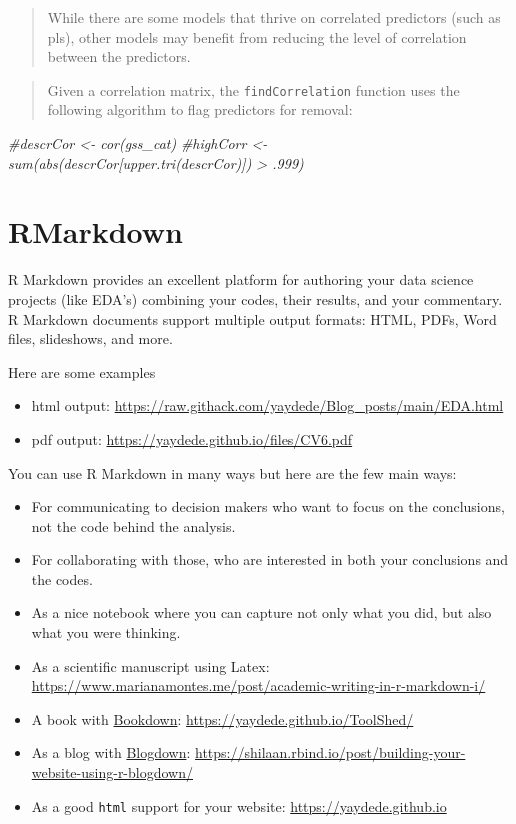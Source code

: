 \documentclass[
]{book}
\newenvironment{Shaded}{\begin{snugshade}}{\end{snugshade}}
\newcommand{\CommentTok}[1]{\textcolor[rgb]{0.56,0.35,0.01}{\textit{#1}}}
\providecommand{\tightlist}{%
  \setlength{\itemsep}{0pt}\setlength{\parskip}{0pt}}
\begin{document}
\begin{quote}
While there are some models that thrive on correlated predictors (such as pls), other models may benefit from reducing the level of correlation between the predictors.
\end{quote}

\begin{quote}
Given a correlation matrix, the \texttt{findCorrelation} function uses the following algorithm to flag predictors for removal:
\end{quote}

\begin{Shaded}
\begin{Highlighting}[]
\CommentTok{\#descrCor \textless{}{-}  cor(gss\_cat)}
\CommentTok{\#highCorr \textless{}{-} sum(abs(descrCor[upper.tri(descrCor)]) \textgreater{} .999)}
\end{Highlighting}
\end{Shaded}

\hypertarget{rmarkdown}{%
\section{RMarkdown}\label{rmarkdown}}

R Markdown provides an excellent platform for authoring your data science projects (like EDA's) combining your codes, their results, and your commentary. R Markdown documents support multiple output formats: HTML, PDFs, Word files, slideshows, and more.

Here are some examples

\begin{itemize}
\tightlist
\item
  html output: \url{https://raw.githack.com/yaydede/Blog_posts/main/EDA.html}
\item
  pdf output: \url{https://yaydede.github.io/files/CV6.pdf}
\end{itemize}

You can use R Markdown in many ways but here are the few main ways:

\begin{itemize}
\tightlist
\item
  For communicating to decision makers who want to focus on the conclusions, not the code behind the analysis.
\item
  For collaborating with those, who are interested in both your conclusions and the codes.
\item
  As a nice notebook where you can capture not only what you did, but also what you were thinking.
\item
  As a scientific manuscript using Latex: \url{https://www.marianamontes.me/post/academic-writing-in-r-markdown-i/}
\item
  A book with \href{https://bookdown.org}{Bookdown}: \url{https://yaydede.github.io/ToolShed/}
\item
  As a blog with \href{https://bookdown.org/yihui/blogdown/}{Blogdown}: \url{https://shilaan.rbind.io/post/building-your-website-using-r-blogdown/}
\item
  As a good \texttt{html} support for your website: \url{https://yaydede.github.io}
\end{itemize}
\end{document}
